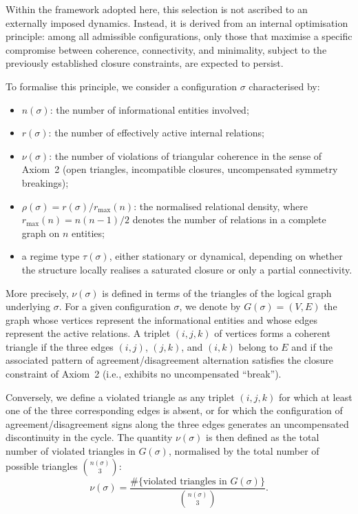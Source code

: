 \documentclass[11pt,a4paper]{article}
\begin{document}
Within the framework adopted here, this selection is not ascribed to an externally imposed dynamics. Instead, it is derived from an internal optimisation principle: among all admissible configurations, only those that maximise a specific compromise between coherence, connectivity, and minimality, subject to the previously established closure constraints, are expected to persist.

To formalise this principle, we consider a configuration \(\sigma\) characterised by:
\begin{itemize}[label=-]
  \item \(n(\sigma)\): the number of informational entities involved;
  \item \(r(\sigma)\): the number of effectively active internal relations;
  \item \(\nu(\sigma)\): the number of violations of triangular coherence in the sense of Axiom~2 (open triangles, incompatible closures, uncompensated symmetry breakings);
  \item \(\rho(\sigma) = r(\sigma)/r_{\max}(n)\): the normalised relational density, where \(r_{\max}(n) = n(n-1)/2\) denotes the number of relations in a complete graph on \(n\) entities;
  \item a regime type \(\tau(\sigma)\), either stationary or dynamical, depending on whether the structure locally realises a saturated closure or only a partial connectivity.
\end{itemize}

More precisely, \(\nu(\sigma)\) is defined in terms of the triangles of the logical graph underlying \(\sigma\). For a given configuration \(\sigma\), we denote by \(G(\sigma) = (V,E)\) the graph whose vertices represent the informational entities and whose edges represent the active relations. A triplet \((i,j,k)\) of vertices forms a coherent triangle if the three edges \((i,j)\), \((j,k)\), and \((i,k)\) belong to \(E\) and if the associated pattern of agreement/disagreement alternation satisfies the closure constraint of Axiom~2 (i.e., exhibits no uncompensated “break”).

Conversely, we define a violated triangle as any triplet \((i,j,k)\) for which at least one of the three corresponding edges is absent, or for which the configuration of agreement/disagreement signs along the three edges generates an uncompensated discontinuity in the cycle. The quantity \(\nu(\sigma)\) is then defined as the total number of violated triangles in \(G(\sigma)\), normalised by the total number of possible triangles \(\binom{n(\sigma)}{3}\):
\[
\nu(\sigma)
= \frac{\#\{\text{violated triangles in } G(\sigma)\}}{\binom{n(\sigma)}{3}}.
\]
\end{document}

